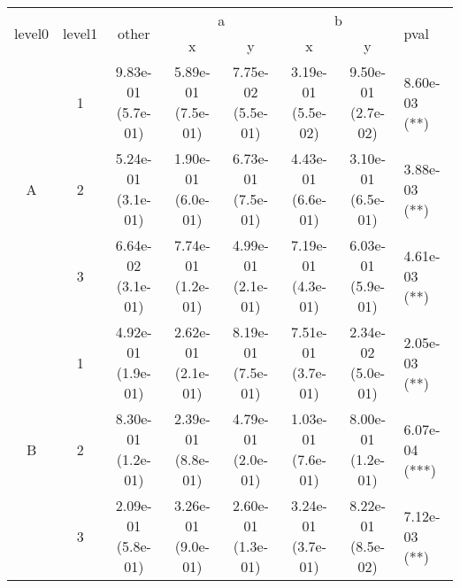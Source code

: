 \begin{tabular}{cccccccl}
\toprule
\multirow{2}{*}{level0} & \multirow{2}{*}{level1}& \multirow{2}{*}{other}&\multicolumn{2}{c}{a}&\multicolumn{2}{c}{b}& \multirow{2}{*}{pval}\tabularnewline
\cmidrule(lr){4-5}
\cmidrule(lr){6-7}
&&&x&y&x&y\tabularnewline
\midrule
\multirow{3}{*}{A}&1& 9.83e-01 (5.7e-01)& 5.89e-01 (7.5e-01)& 7.75e-02 (5.5e-01)& 3.19e-01 (5.5e-02)& 9.50e-01 (2.7e-02)& 8.60e-03 (**)\tabularnewline
&2& 5.24e-01 (3.1e-01)& 1.90e-01 (6.0e-01)& 6.73e-01 (7.5e-01)& 4.43e-01 (6.6e-01)& 3.10e-01 (6.5e-01)& 3.88e-03 (**)\tabularnewline
&3& 6.64e-02 (3.1e-01)& 7.74e-01 (1.2e-01)& 4.99e-01 (2.1e-01)& 7.19e-01 (4.3e-01)& 6.03e-01 (5.9e-01)& 4.61e-03 (**)\tabularnewline
\midrule
\multirow{3}{*}{B}&1& 4.92e-01 (1.9e-01)& 2.62e-01 (2.1e-01)& 8.19e-01 (7.5e-01)& 7.51e-01 (3.7e-01)& 2.34e-02 (5.0e-01)& 2.05e-03 (**)\tabularnewline
&2& 8.30e-01 (1.2e-01)& 2.39e-01 (8.8e-01)& 4.79e-01 (2.0e-01)& 1.03e-01 (7.6e-01)& 8.00e-01 (1.2e-01)& 6.07e-04 (***)\tabularnewline
&3& 2.09e-01 (5.8e-01)& 3.26e-01 (9.0e-01)& 2.60e-01 (1.3e-01)& 3.24e-01 (3.7e-01)& 8.22e-01 (8.5e-02)& 7.12e-03 (**)\tabularnewline
\bottomrule
\end{tabular}
